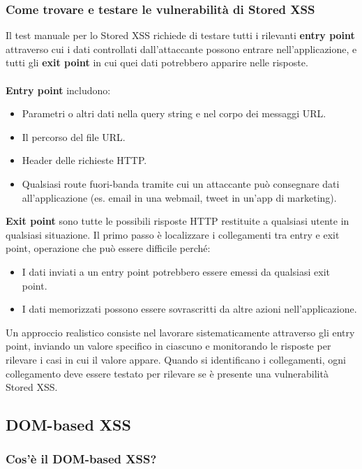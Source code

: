 \documentclass[12pt,a4paper]{report}
\begin{document}
	\subsubsection{Come trovare e testare le vulnerabilità di Stored XSS}
	
	Il test manuale per lo Stored XSS richiede di testare tutti i rilevanti \textbf{entry point} attraverso cui i dati controllati dall'attaccante possono entrare nell'applicazione, e tutti gli \textbf{exit point} in cui quei dati potrebbero apparire nelle risposte.\\\\
	\textbf{Entry point} includono:
	\begin{itemize}
		\item Parametri o altri dati nella query string e nel corpo dei messaggi URL.
		\item Il percorso del file URL.
		\item Header delle richieste HTTP.
		\item Qualsiasi route fuori-banda tramite cui un attaccante può consegnare dati all'applicazione (es. email in una webmail, tweet in un'app di marketing).
	\end{itemize}
	\textbf{Exit point} sono tutte le possibili risposte HTTP restituite a qualsiasi utente in qualsiasi situazione.
	Il primo passo è localizzare i collegamenti tra entry e exit point, operazione che può essere difficile perché:
	\begin{itemize}
		\item I dati inviati a un entry point potrebbero essere emessi da qualsiasi exit point.
		\item I dati memorizzati possono essere sovrascritti da altre azioni nell'applicazione.
	\end{itemize}
	Un approccio realistico consiste nel lavorare sistematicamente attraverso gli entry point, inviando un valore specifico in ciascuno e monitorando le risposte per rilevare i casi in cui il valore appare. Quando si identificano i collegamenti, ogni collegamento deve essere testato per rilevare se è presente una vulnerabilità Stored XSS.
	
	\subsection{DOM-based XSS}
	
	\subsubsection{Cos'è il DOM-based XSS?}
	
\end{document}
